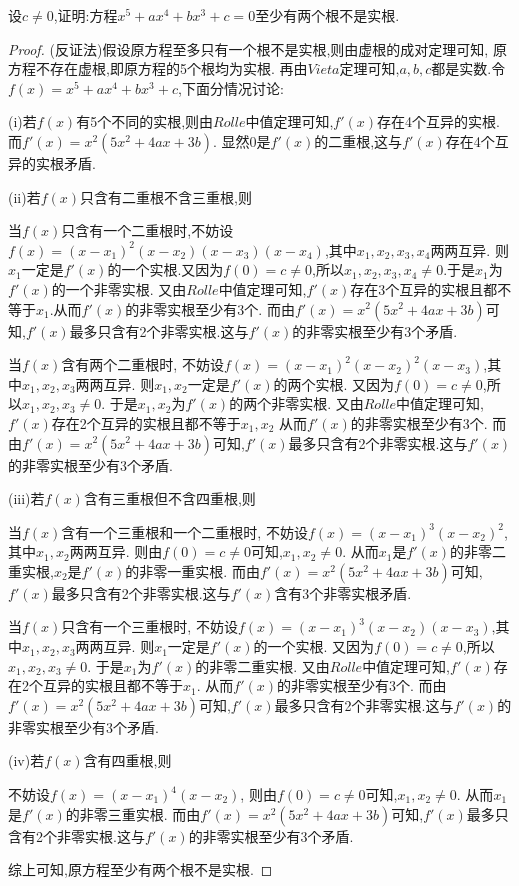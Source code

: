 \documentclass[lang=cn,newtx,10pt,scheme=chinese]{../Template/elegantbook}
\begin{document}
\begin{exercise}
    设\(c\neq0\),证明:方程\(x^5 + ax^4 + bx^3 + c = 0\)至少有两个根不是实根.
\end{exercise}
    \begin{proof}
        (反证法)假设原方程至多只有一个根不是实根,则由虚根的成对定理可知,
        原方程不存在虚根,即原方程的5个根均为实根.
        再由$Vieta$定理可知,$a,b,c$都是实数.令$f(x)=x^5+ax^4+bx^3+c$,下面分情况讨论:

        (i)若$f(x)$有5个不同的实根,则由$Rolle$中值定理可知,$f'(x)$存在4个互异的实根.
        而$f'(x) =x^2(5x^2+4ax+3b)$.
        显然0是$f'(x)$的二重根,这与$f'(x)$存在4个互异的实根矛盾.

        (ii)若$f(x)$只含有二重根不含三重根,则

        当$f(x)$只含有一个二重根时,不妨设$f(x)=(x-x_1)^2(x-x_2)(x-x_3)(x-x_4)$,其中$x_1,x_2,x_3,x_4$两两互异.
        则$x_1$一定是$f'(x)$的一个实根.又因为$f(0)=c\ne0$,所以$x_1,x_2,x_3,x_4\ne0$.于是$x_1$为$f'(x)$的一个非零实根.
        又由$Rolle$中值定理可知,$f'(x)$存在3个互异的实根且都不等于$x_1$.从而$f'(x)$的非零实根至少有3个.
        而由$f'(x) =x^2(5x^2+4ax+3b)$可知,$f'(x)$最多只含有2个非零实根.这与$f'(x)$的非零实根至少有3个矛盾.

        当$f(x)$含有两个二重根时,
        不妨设$f(x)=(x-x_1)^2(x-x_2)^2(x-x_3)$,其中$x_1,x_2,x_3$两两互异.
        则$x_1,x_2$一定是$f'(x)$的两个实根.
        又因为$f(0)=c\ne0$,所以$x_1,x_2,x_3\ne0$.
        于是$x_1,x_2$为$f'(x)$的两个非零实根.
        又由$Rolle$中值定理可知,$f'(x)$存在2个互异的实根且都不等于$x_1,x_2$
        从而$f'(x)$的非零实根至少有3个.
        而由$f'(x) =x^2(5x^2+4ax+3b)$可知,$f'(x)$最多只含有2个非零实根.这与$f'(x)$的非零实根至少有3个矛盾.

        (iii)若$f(x)$含有三重根但不含四重根,则

        当$f(x)$含有一个三重根和一个二重根时,
        不妨设$f(x)=(x-x_1)^3(x-x_2)^2$,其中$x_1,x_2$两两互异.
        则由$f(0)=c\ne0$可知,$x_1,x_2\ne0$.
        从而$x_1$是$f'(x)$的非零二重实根,$x_2$是$f'(x)$的非零一重实根.
        而由$f'(x) =x^2(5x^2+4ax+3b)$可知,$f'(x)$最多只含有2个非零实根.这与$f'(x)$含有3个非零实根矛盾.
        
        当$f(x)$只含有一个三重根时,
        不妨设$f(x)=(x-x_1)^3(x-x_2)(x-x_3)$,其中$x_1,x_2,x_3$两两互异.
        则$x_1$一定是$f'(x)$的一个实根.
        又因为$f(0)=c\ne0$,所以$x_1,x_2,x_3\ne0$.
        于是$x_1$为$f'(x)$的非零二重实根.
        又由$Rolle$中值定理可知,$f'(x)$存在2个互异的实根且都不等于$x_1$.
        从而$f'(x)$的非零实根至少有3个.
        而由$f'(x) =x^2(5x^2+4ax+3b)$可知,$f'(x)$最多只含有2个非零实根.这与$f'(x)$的非零实根至少有3个矛盾.

        (iv)若$f(x)$含有四重根,则

        不妨设$f(x)=(x-x_1)^4(x-x_2)$,
        则由$f(0)=c\ne0$可知,$x_1,x_2\ne0$.
        从而$x_1$是$f'(x)$的非零三重实根.
        而由$f'(x) =x^2(5x^2+4ax+3b)$可知,$f'(x)$最多只含有2个非零实根.这与$f'(x)$的非零实根至少有3个矛盾.

        综上可知,原方程至少有两个根不是实根.
    
\end{proof}
\end{document}
